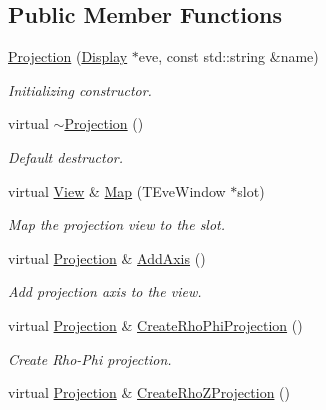 \subsection*{Public Member Functions}
\begin{DoxyCompactItemize}
\item 
\hyperlink{class_d_d4hep_1_1_projection_a7e6355eabd19c474eefd0572fc2b8026}{Projection} (\hyperlink{class_d_d4hep_1_1_display}{Display} $\ast$eve, const std::string \&name)
\begin{DoxyCompactList}\small\item\em Initializing constructor. \item\end{DoxyCompactList}\item 
virtual \hyperlink{class_d_d4hep_1_1_projection_ac0554f994078308f0169a4629a2d1b0a}{$\sim$Projection} ()
\begin{DoxyCompactList}\small\item\em Default destructor. \item\end{DoxyCompactList}\item 
virtual \hyperlink{class_d_d4hep_1_1_view}{View} \& \hyperlink{class_d_d4hep_1_1_projection_a68380e96afb21b0c4fd52e986032df80}{Map} (TEveWindow $\ast$slot)
\begin{DoxyCompactList}\small\item\em Map the projection view to the slot. \item\end{DoxyCompactList}\item 
virtual \hyperlink{class_d_d4hep_1_1_projection}{Projection} \& \hyperlink{class_d_d4hep_1_1_projection_a06d9f151c2e689580f04967905bd97b8}{AddAxis} ()
\begin{DoxyCompactList}\small\item\em Add projection axis to the view. \item\end{DoxyCompactList}\item 
virtual \hyperlink{class_d_d4hep_1_1_projection}{Projection} \& \hyperlink{class_d_d4hep_1_1_projection_aa2e3b7e69527aca46f8531e4fc523f1f}{CreateRhoPhiProjection} ()
\begin{DoxyCompactList}\small\item\em Create Rho-\/Phi projection. \item\end{DoxyCompactList}\item 
virtual \hyperlink{class_d_d4hep_1_1_projection}{Projection} \& \hyperlink{class_d_d4hep_1_1_projection_ade3fca7391ef9616f9b9235d4e07a423}{CreateRhoZProjection} ()

\end{DoxyCompactItemize}

